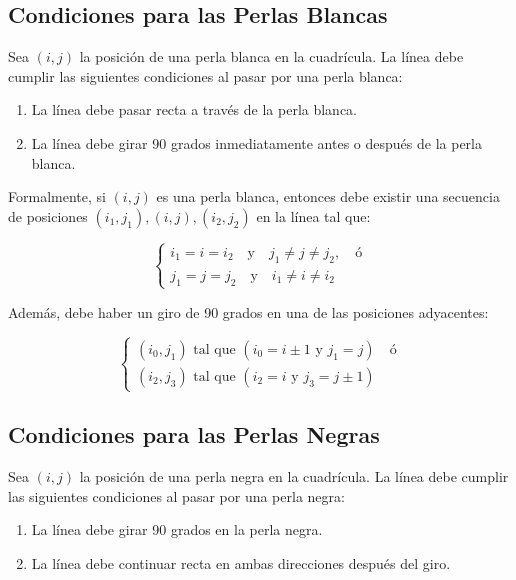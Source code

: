 \documentclass{article}
\begin{document}
\subsection{Condiciones para las Perlas Blancas}

Sea \( (i, j) \) la posición de una perla blanca en la cuadrícula. La línea debe cumplir las siguientes condiciones al pasar por una perla blanca:

\begin{enumerate}
    \item La línea debe pasar recta a través de la perla blanca.
    \item La línea debe girar 90 grados inmediatamente antes o después de la perla blanca.
\end{enumerate}

Formalmente, si \( (i, j) \) es una perla blanca, entonces debe existir una secuencia de posiciones \( (i_1, j_1), (i, j), (i_2, j_2) \) en la línea tal que:

\[
\begin{cases}
i_1 = i = i_2 \quad \text{y} \quad j_1 \neq j \neq j_2, \quad \text{ó}\\
j_1 = j = j_2 \quad \text{y} \quad i_1 \neq i \neq i_2
\end{cases}
\]

Además, debe haber un giro de 90 grados en una de las posiciones adyacentes:

\[
\begin{cases}
(i_0, j_1) \text{ tal que } (i_0 = i \pm 1 \text{ y } j_1 = j) \quad \text{ó}\\
(i_2, j_3) \text{ tal que } (i_2 = i \text{ y } j_3 = j \pm 1)
\end{cases}
\]

\subsection{Condiciones para las Perlas Negras}

Sea \( (i, j) \) la posición de una perla negra en la cuadrícula. La línea debe cumplir las siguientes condiciones al pasar por una perla negra:

\begin{enumerate}
    \item La línea debe girar 90 grados en la perla negra.
    \item La línea debe continuar recta en ambas direcciones después del giro.
\end{enumerate}
\end{document}
